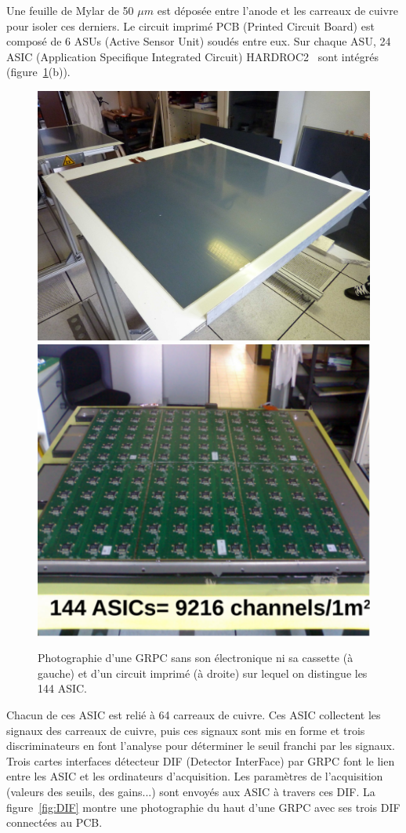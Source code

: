 Une feuille de Mylar de 50 $\mu m$ est déposée entre l'anode et les carreaux de cuivre pour isoler ces derniers. Le circuit imprimé PCB (Printed Circuit Board) est composé de 6 ASUs (Active Sensor Unit) soudés entre eux. Sur chaque ASU, 24 ASIC (Application Specifique Integrated Circuit) HARDROC2~\cite{omega} sont intégrés (figure~\ref{fig:layer}(b)). 
\begin{figure}[!ht]
  \begin{center}
    \includegraphics[width=.47\textwidth]{SDHCAL/figs/aLayer.jpg}
    \includegraphics[width=.4\textwidth]{SDHCAL/figs/layer_electronic2.pdf}
    \caption{Photographie d'une GRPC sans son électronique ni sa cassette (à gauche) et d'un circuit imprimé (à droite) sur lequel on distingue les 144 ASIC.}
    \label{fig:layer}
  \end{center}
\end{figure}
Chacun de ces ASIC est relié à 64 carreaux de cuivre. Ces ASIC collectent les signaux des carreaux de cuivre, puis ces signaux sont mis en forme et trois discriminateurs en font l'analyse pour déterminer le seuil franchi par les signaux. Trois cartes interfaces détecteur DIF (Detector InterFace) par GRPC font le lien entre les ASIC et les ordinateurs d'acquisition. Les paramètres de l'acquisition (valeurs des seuils, des gains...) sont envoyés aux ASIC à travers ces DIF. La figure~\ref{fig:DIF} montre une photographie du haut d'une GRPC avec ses trois DIF connectées au PCB.
